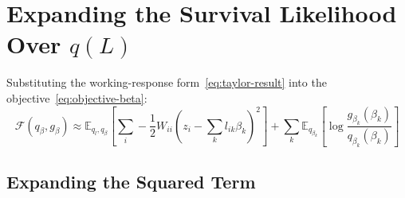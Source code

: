 \documentclass[11pt]{article}
\begin{document}
\section{Expanding the Survival Likelihood Over $q(L)$}\label{sec:expand}

Substituting the working-response form~\eqref{eq:taylor-result} into the
objective~\eqref{eq:objective-beta}:
\begin{equation}
  \mathcal{F}(q_\beta, g_\beta) \approx
  \mathbb{E}_{q_l, q_\beta}\!\left[\sum_i -\frac{1}{2}W_{ii}\!\left(z_i - \sum_k l_{ik}\beta_k\right)^{\!2}\right]
  + \sum_k \mathbb{E}_{q_{\beta_k}}\!\left[\log\frac{g_{\beta_k}(\beta_k)}{q_{\beta_k}(\beta_k)}\right]
  \label{eq:obj-expanded}
\end{equation}

\subsection{Expanding the Squared Term}
\end{document}

